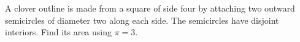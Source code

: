 A clover outline is made from a square of side four by attaching two outward semicircles of diameter two along each side. The semicircles have disjoint interiors. Find its area using $\pi=3$.
